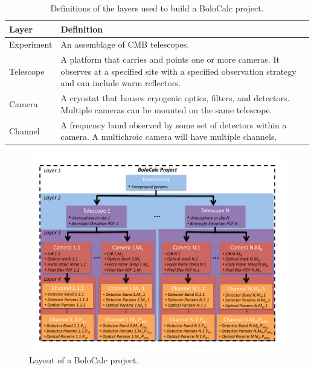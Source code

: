 \documentclass[11pt]{article} %
\begin{document}
\begin{table}[!ht]
	\centering
    \tabulinesep=0.8mm
	\begin{tabu}[t]{|| l | p{13cm} ||}
    \hline
    \textbf{Layer} & \textbf{Definition} \\
    \hline
    \hline
    Experiment & An assemblage of CMB telescopes. \\
    \hline
    Telescope & A platform that carries and points one or more cameras. It observes at a specified site with a specified observation strategy and can include warm reflectors. \\
    \hline
    Camera & A cryostat that houses cryogenic optics, filters, and detectors. Multiple cameras can be mounted on the same telescope. \\
    \hline
    Channel & A frequency band observed by some set of detectors within a camera. A multichroic camera will have multiple channels. \\
    \hline
    \end{tabu}
    \caption{Definitions of the layers used to build a BoloCalc project.  \label{table:defs}} 
\end{table}

\vspace{-1.2mm}

\begin{figure}[!ht]
	\centering
	\includegraphics[trim={1cm, 0.8cm, 1.1cm, 1cm}, clip, width=1.00\textwidth]{OrgDiagram.pdf}
	\caption{Layout of a BoloCalc project. \label{fig:expstruct}}
\end{figure}
\end{document}
